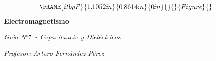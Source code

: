\documentclass{article}
\begin{document}
\begin{center}
\begin{equation*}
\FRAME{itbpF}{1.1052in}{0.8614in}{0in}{}{}{Figure}{\special{language
"Scientific Word";type "GRAPHIC";maintain-aspect-ratio TRUE;display
"USEDEF";valid_file "T";width 1.1052in;height 0.8614in;depth
0in;original-width 2.6809in;original-height 2.0833in;cropleft "0";croptop
"1";cropright "1";cropbottom "0";tempfilename
'R23O0G00.bmp';tempfile-properties "XPR";}}
\end{equation*}%
\textbf{Electromagnetismo}

\emph{Gu\'{\i}a N}$%
{{}^\circ}%
7$\emph{\ - Capacitancia y Diel\'{e}ctricos}

\textit{Profesor: Arturo Fern\'{a}ndez P\'{e}rez}
\end{center}
\end{document}
